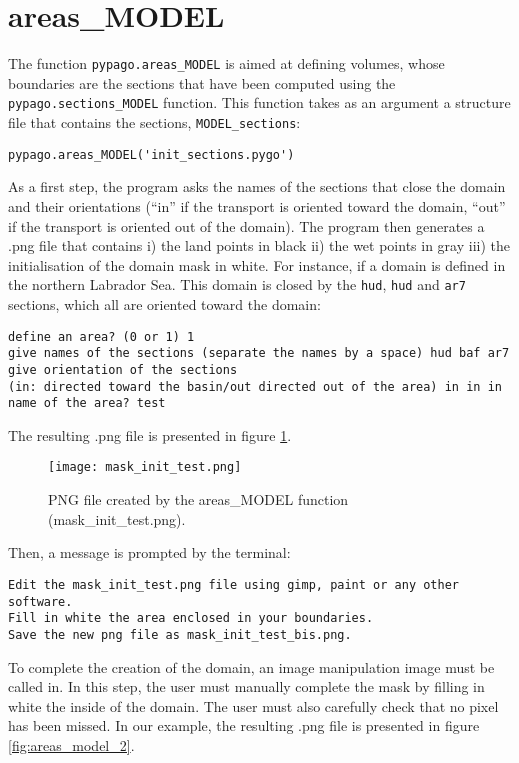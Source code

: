 \section{areas\_MODEL}

The function \verb+pypago.areas_MODEL+ is aimed at defining volumes, whose
boundaries are the sections that have been computed using the
\verb+pypago.sections_MODEL+ function. This function takes as an argument a
structure file that contains the sections, \verb+MODEL_sections+:
\begin{verbatim}
pypago.areas_MODEL('init_sections.pygo')
\end{verbatim}

As a first step, the program asks the names of the sections that close the domain and their orientations (``in'' if the transport is oriented toward the domain, ``out'' if the transport is oriented out of the domain). The program then generates a .png file that contains i) the land points in black ii) the wet points in gray iii) the initialisation of the domain mask in white. For instance, if a domain is defined in the northern Labrador Sea. This domain is closed by the \verb+hud+, \verb+hud+ and \verb+ar7+ sections, which all are oriented toward the domain:

\begin{verbatim}
define an area? (0 or 1) 1
give names of the sections (separate the names by a space) hud baf ar7
give orientation of the sections 
(in: directed toward the basin/out directed out of the area) in in in
name of the area? test
\end{verbatim}

The resulting .png file is presented in figure \ref{fig:areas_model_1}.\\

\begin{figure}[h!]
\centering
\texttt{[image: mask\_init\_test.png]}
\caption{PNG file created by the areas\_MODEL function (mask\_init\_test.png).}
\label{fig:areas_model_1}
\end{figure}

Then, a message is prompted by the terminal:
\begin{verbatim}
Edit the mask_init_test.png file using gimp, paint or any other software. 
Fill in white the area enclosed in your boundaries.  
Save the new png file as mask_init_test_bis.png.
\end{verbatim}

To complete the creation of the domain, an image manipulation image must be called in. In this step, the user must manually complete the mask by filling in white the inside of the domain. The user must also carefully check that no pixel has been missed. In our example, the resulting .png file is presented in figure \ref{fig:areas_model_2}.\\

